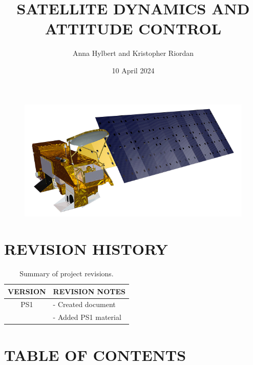 \documentclass[12pt,a4paper,notitlepage]{article}
\begin{document}
\title{\Huge \textbf{SATELLITE DYNAMICS AND ATTITUDE CONTROL}}
\author{Anna Hylbert and Kristopher Riordan}
\date{10 April 2024}

\begin{minipage}[h]{\textwidth}
	\vspace{4 cm}
	\advance\leftskip-1in
    \maketitle
\end{minipage}

\begin{figure}[H]
\centering
\includegraphics[width = 15cm]{Images/Aqua_spacecraft_model.png}
\end{figure}

\pagebreak

\section*{\Large REVISION HISTORY}

\begin{table}[h!]
\begin{center}
\begin{tabular} [0.9 \textwidth]{cl}
\hline \hline
\multicolumn{1}{c}{VERSION} & \multicolumn{1}{l}{REVISION NOTES} \\
\hline
PS1 & - Created document \\
    & - Added PS1 material \\
\hline \hline
\end{tabular}
	\caption{Summary of project revisions.}
\end{center}
\end{table}
 
\newpage
\section*{\Large TABLE OF CONTENTS}
\makeatletter
{}
\makeatother
\newpage
\end{document}
